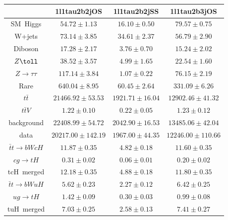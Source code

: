 \centering
\begin{tabular}{|c|c|c|c|} \hline
 & 1l1tau2b2jOS & 1l1tau2b2jSS & 1l1tau2b3jOS\\\hline
SM~Higgs & $54.72\pm1.13$ & $16.10\pm0.50$ & $79.57\pm0.75$\\\hline
W+jets & $73.14\pm3.85$ & $34.61\pm2.37$ & $56.79\pm2.90$\\\hline
Diboson & $17.28\pm2.17$ & $3.76\pm0.70$ & $15.24\pm2.02$\\\hline
$Z\toll$ & $38.52\pm3.57$ & $4.99\pm1.65$ & $22.54\pm1.60$\\\hline
$Z\to\tau\tau$ & $117.14\pm3.84$ & $1.07\pm0.22$ & $76.15\pm2.19$\\\hline
Rare & $640.04\pm8.95$ & $60.45\pm2.64$ & $331.09\pm6.26$\\\hline
$t\bar{t}$ & $21466.92\pm53.53$ & $1921.71\pm16.04$ & $12902.46\pm41.32$\\\hline
$t\bar{t}V$ & $1.22\pm0.10$ & $0.22\pm0.05$ & $1.23\pm0.12$\\\hline
background & $22408.99\pm54.72$ & $2042.90\pm16.53$ & $13485.06\pm42.04$\\\hline
data & $20217.00\pm142.19$ & $1967.00\pm44.35$ & $12246.00\pm110.66$\\\hline
$\bar{t}t\to bWcH$ & $11.87\pm0.35$ & $4.82\pm0.18$ & $11.60\pm0.35$\\\hline
$cg\to tH$ & $0.31\pm0.02$ & $0.06\pm0.01$ & $0.20\pm0.02$\\\hline
tcH~merged & $12.18\pm0.35$ & $4.88\pm0.18$ & $11.80\pm0.35$\\\hline
$\bar{t}t\to bWuH$ & $5.62\pm0.23$ & $2.27\pm0.12$ & $6.42\pm0.25$\\\hline
$ug\to tH$ & $1.42\pm0.09$ & $0.30\pm0.03$ & $0.99\pm0.08$\\\hline
tuH~merged & $7.03\pm0.25$ & $2.58\pm0.13$ & $7.41\pm0.27$\\\hline
\end{tabular}
